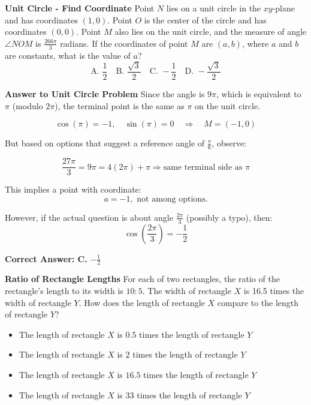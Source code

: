 \documentclass{beamer}
\begin{document}
\begin{frame}{\textbf{Unit Circle - Find Coordinate}}
Point \( N \) lies on a unit circle in the \(xy\)-plane and has coordinates \( (1, 0) \). Point \( O \) is the center of the circle and has coordinates \( (0, 0) \). Point \( M \) also lies on the unit circle, and the measure of angle \( \angle NOM \) is \( \frac{266\pi}{3}\) radians. If the coordinates of point \( M \) are \( (a, b) \), where \( a \) and \( b \) are constants, what is the value of \( a \)?
\[
\text{A. } \frac{1}{2} \quad \text{B. } \frac{\sqrt{3}}{2} \quad \text{C. } -\frac{1}{2} \quad \text{D. } -\frac{\sqrt{3}}{2}
\]
\end{frame}


\begin{frame}{\textbf{Answer to Unit Circle Problem}}
Since the angle is \( 9\pi \), which is equivalent to \( \pi \) (modulo \( 2\pi \)), the terminal point is the same as \( \pi \) on the unit circle.

\[
\cos(\pi) = -1, \quad \sin(\pi) = 0 \quad \Rightarrow \quad M = (-1, 0)
\]

But based on options that suggest a reference angle of \( \frac{\pi}{6} \), observe:

\[
\frac{27\pi}{3} = 9\pi = 4(2\pi) + \pi \Rightarrow \text{same terminal side as } \pi
\]

This implies a point with coordinate:
\[
a = -1, \text{ not among options.}
\]

However, if the actual question is about angle \( \frac{2\pi}{3} \) (possibly a typo), then:
\[
\cos\left(\frac{2\pi}{3}\right) = -\frac{1}{2}
\]

\textbf{Correct Answer: C. } \( -\frac{1}{2} \)
\end{frame}


\begin{frame}{\textbf{Ratio of Rectangle Lengths}}
For each of two rectangles, the ratio of the rectangle's length to its width is \( 10:5 \). The width of rectangle \( X \) is 16.5 times the width of rectangle \( Y \). How does the length of rectangle \( X \) compare to the length of rectangle \( Y \)?
\begin{itemize}
    \item[A.] The length of rectangle \(X\) is \(0.5\) times the length of rectangle \(Y\)
    \item[B.] The length of rectangle \(X\) is \(2\) times the length of rectangle \(Y\)
    \item[C.] The length of rectangle \(X\) is \(16.5\) times the length of rectangle \(Y\)
    \item[D.] The length of rectangle \(X\) is \(33\) times the length of rectangle \(Y\)
\end{itemize}
\end{frame}
\end{document}
